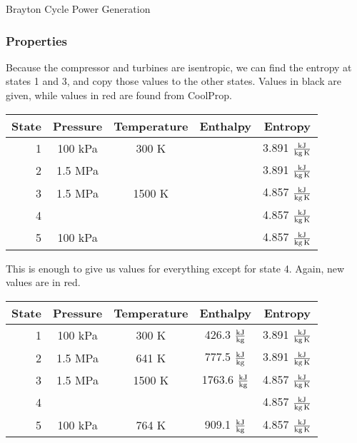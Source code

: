 \begin{example}[label=ex:turboshaft]{Brayton Cycle Power Generation}
  
  \subsubsection*{Properties}

  Because the compressor and turbines are isentropic, we can find the entropy at states 1 and 3, and copy those values to the other states.  Values in black are given, while values in red are found from CoolProp.
  
  \begin{table}[H]
    \centering
    \def\arraystretch{1.5}
    \begin{tabular}{r|cccc}
      State & Pressure & Temperature & Enthalpy & Entropy \\ \hline
      1 & 100 kPa & 300 K &  & {\color{Red} 3.891 $\frac{\rm kJ}{\rm kg\, K}$} \\
      2 & 1.5 MPa &  &  & {\color{Red} 3.891 $\frac{\rm kJ}{\rm kg\, K}$} \\
      3 & 1.5 MPa & 1500 K & & {\color{Red} 4.857 $\frac{\rm kJ}{\rm kg\, K}$} \\
      4 &  &  & & {\color{Red} 4.857 $\frac{\rm kJ}{\rm kg\, K}$} \\
      5 & 100 kPa &  & & {\color{Red} 4.857 $\frac{\rm kJ}{\rm kg\, K}$}
    \end{tabular}
    \def\arraystretch{1.0}
  \end{table}
  
  This is enough to give us values for everything except for state 4.  Again, new values are in red.
  
  \begin{table}[H]
    \centering
    \def\arraystretch{1.5}
    \begin{tabular}{r|cccc}
      State & Pressure & Temperature & Enthalpy & Entropy \\ \hline
      1 & 100 kPa & 300 K & {\color{Red} 426.3 $\frac{\rm kJ}{\rm kg}$} & 3.891 $\frac{\rm kJ}{\rm kg\, K}$ \\
      2 & 1.5 MPa & {\color{Red} 641 K} & {\color{Red} 777.5 $\frac{\rm kJ}{\rm kg}$} & 3.891 $\frac{\rm kJ}{\rm kg\, K}$ \\
      3 & 1.5 MPa & 1500 K & {\color{Red} 1763.6 $\frac{\rm kJ}{\rm kg}$} & 4.857 $\frac{\rm kJ}{\rm kg\, K}$ \\
      4 &  &  &  & 4.857 $\frac{\rm kJ}{\rm kg\, K}$ \\
      5 & 100 kPa & {\color{Red} 764 K} &  {\color{Red} 909.1 $\frac{\rm kJ}{\rm kg}$} & 4.857 $\frac{\rm kJ}{\rm kg\, K}$
    \end{tabular}
    \def\arraystretch{1.0}
  \end{table}
  

\end{example}
